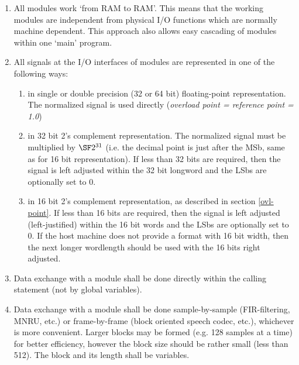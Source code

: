 \begin{enumerate}

\item All modules work `from RAM to RAM'. This means that the working
      modules are independent from physical I/O functions which are
      normally machine dependent.  This approach also allows easy
      cascading of modules within one `main' program.

\item All signals at the I/O interfaces of modules are represented in one
      of the following ways:

      \begin{enumerate}
        \item in single or double precision (32 or 64 bit) floating-point
              representation.  The normalized signal is used directly
              ({\em overload point = reference point = 1.0})

        \item in 32 bit 2's complement representation. The normalized signal
              must be multiplied by $\SF 2^{31}$ (i.e. the decimal
              point is just after the MSb, same as for 16 bit
              representation).  If less than 32 bits are required,
              then the signal is left adjusted within the 32 bit
              longword and the LSbs are optionally set to 0.

        \item in 16 bit 2's complement representation, as described in
              section \ref{ovl-point}.  If less than 16 bits are
              required, then the signal is left adjusted
              (left-justified) within the 16 bit words and the LSbs
              are optionally set to 0. If the host machine does not
              provide a format with 16 bit width, then the next
              longer wordlength should be used with the 16 bits right
              adjusted.
      \end{enumerate}

\item Data exchange with a module shall be done directly within the
      calling statement (not by global variables).

\item Data exchange with a module shall be done sample-by-sample
      (FIR-filtering, MNRU, etc.) or frame-by-frame (block oriented
      speech codec, etc.), whichever is more convenient. Larger
      blocks may be formed (e.g. 128 samples at a time) for better
      efficiency, however the block size should be rather small
      (less than 512). The block and its length shall be variables.


\end{enumerate}
